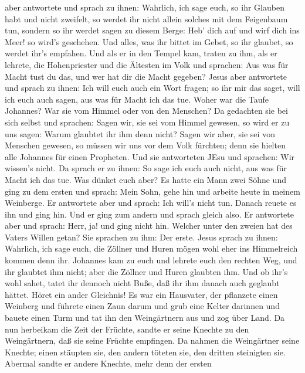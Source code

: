 aber antwortete und sprach zu ihnen: Wahrlich, ich sage euch, so ihr
Glauben habt und nicht zweifelt, so werdet ihr nicht allein solches mit
dem Feigenbaum tun, sondern so ihr werdet sagen zu diesem Berge: Heb'
dich auf und wirf dich ins Meer! so wird's geschehen.  Und
alles, was ihr bittet im Gebet, so ihr glaubet, so werdet ihr's
empfahen.  Und als er in den Tempel kam, traten zu ihm, als
er lehrete, die Hohenpriester und die Ältesten im Volk und sprachen: Aus
was für Macht tust du das, und wer hat dir die Macht gegeben?
 Jesus aber antwortete und sprach zu ihnen: Ich will euch
auch ein Wort fragen; so ihr mir das saget, will ich euch auch sagen,
aus was für Macht ich das tue.  Woher war die Taufe
Johannes? War sie vom Himmel oder von den Menschen? Da gedachten sie bei
sich selbst und sprachen: Sagen wir, sie sei vom Himmel gewesen, so wird
er zu uns sagen: Warum glaubtet ihr ihm denn nicht?  Sagen
wir aber, sie sei von Menschen gewesen, so müssen wir uns vor dem Volk
fürchten; denn sie hielten alle Johannes für einen Propheten.
 Und sie antworteten JEsu und sprachen: Wir wissen's nicht.
Da sprach er zu ihnen: So sage ich euch auch nicht, aus was für Macht
ich das tue.  Was dünket euch aber? Es hatte ein Mann zwei
Söhne und ging zu dem ersten und sprach: Mein Sohn, gehe hin und arbeite
heute in meinem Weinberge.  Er antwortete aber und sprach:
Ich will's nicht tun. Danach reuete es ihn und ging hin. 
Und er ging zum andern und sprach gleich also. Er antwortete aber und
sprach: Herr, ja! und ging nicht hin.  Welcher unter den
zweien hat des Vaters Willen getan? Sie sprachen zu ihm: Der erste.
Jesus sprach zu ihnen: Wahrlich, ich sage euch, die Zöllner und Huren
mögen wohl eher ins Himmelreich kommen denn ihr.  Johannes
kam zu euch und lehrete euch den rechten Weg, und ihr glaubtet ihm
nicht; aber die Zöllner und Huren glaubten ihm. Und ob ihr's wohl sahet,
tatet ihr dennoch nicht Buße, daß ihr ihm danach auch geglaubt hättet.
 Höret ein ander Gleichnis! Es war ein Hausvater, der
pflanzete einen Weinberg und führete einen Zaun darum und grub eine
Kelter darinnen und bauete einen Turm und tat ihn den Weingärtnern aus
und zog über Land.  Da nun herbeikam die Zeit der Früchte,
sandte er seine Knechte zu den Weingärtnern, daß sie seine Früchte
empfingen.  Da nahmen die Weingärtner seine Knechte; einen
stäupten sie, den andern töteten sie, den dritten steinigten sie.
 Abermal sandte er andere Knechte, mehr denn der ersten
